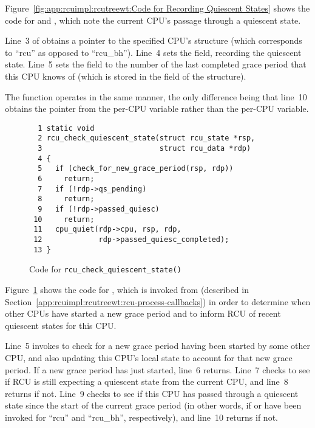 Figure~\ref{fig:app:rcuimpl:rcutreewt:Code for Recording Quiescent States}
shows the code for  and ,
which note the current CPU's passage through a quiescent state.

Line~3 of  obtains a pointer to the specified
CPU's  structure (which corresponds to ``rcu'' as opposed
to ``rcu\_bh'').
Line~4 sets the  field, recording the
quiescent state.
Line~5 sets the  field to the number
of the last completed grace period that this CPU knows of (which is
stored in the  field of the 
structure).

The  function operates in the same manner,
the only difference being that line~10 obtains the 
pointer from the  per-CPU variable rather than
the  per-CPU variable.

\begin{figure}[tbp]
{ \scriptsize
\begin{verbatim}
  1 static void
  2 rcu_check_quiescent_state(struct rcu_state *rsp,
  3                           struct rcu_data *rdp)
  4 {
  5   if (check_for_new_grace_period(rsp, rdp))
  6     return;
  7   if (!rdp->qs_pending)
  8     return;
  9   if (!rdp->passed_quiesc)
 10     return;
 11   cpu_quiet(rdp->cpu, rsp, rdp,
 12             rdp->passed_quiesc_completed);
 13 }
\end{verbatim}
}
\caption{Code for {\tt rcu\_check\_quiescent\_state()}}
\label{fig:app:rcuimpl:rcutreewt:Code for rcu-check-quiescent-state}
\end{figure}

Figure~\ref{fig:app:rcuimpl:rcutreewt:Code for rcu-check-quiescent-state}
shows the code for , which is invoked
from 
(described in Section~\ref{app:rcuimpl:rcutreewt:rcu-process-callbacks})
in order to determine when other CPUs have started a new grace period
and to inform RCU of recent quiescent states for this CPU.

Line~5 invokes  to check for
a new grace period having been started by some other CPU, and also
updating this CPU's local state to account for that new grace period.
If a new grace period has just started, line~6 returns.
Line~7 checks to see if RCU is still expecting a quiescent state from
the current CPU, and line~8 returns if not.
Line~9 checks to see if this CPU has passed through a quiescent state
since the start of the current grace period (in other words, if
 or  have been invoked
for ``rcu'' and ``rcu\_bh'', respectively), and line~10 returns if not.

